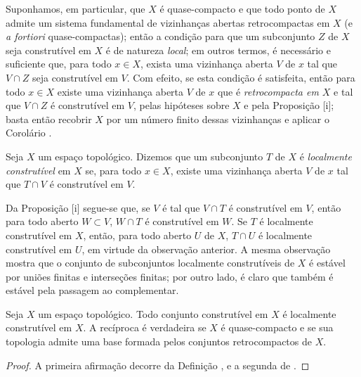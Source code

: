 \begin{env}[9.1.10]
\label{0.9.1.10}
Suponhamos, em particular, que $X$ é quase-compacto e que todo ponto
de $X$ admite um sistema fundamental de vizinhanças abertas retrocompactas em $X$ (e \emph{a fortiori} quase-compactas); então a condição para que um subconjunto $Z$ de $X$ seja construtível em $X$ é de natureza \emph{local}; em outros termos, é necessário e suficiente que, para todo $x\in X$, exista uma vizinhança aberta $V$ de $x$ tal que $V\cap Z$ seja construtível em $V$.
Com efeito, se esta condição é satisfeita, então para todo $x\in X$ existe uma vizinhança aberta $V$ de $x$ que é \emph{retrocompacta em $X$} e tal que $V\cap Z$ é construtível em $V$, pelas hipóteses sobre $X$ e pela Proposição [i]; basta então recobrir $X$ por um número finito dessas vizinhanças e aplicar o Corolário .
\end{env}

\begin{definition}[9.1.11]
\label{0.9.1.11}
Seja $X$ um espaço topológico.
Dizemos que um subconjunto $T$ de $X$ é \emph{localmente construtível} em $X$ se, para todo $x\in X$, existe uma vizinhança aberta $V$ de $x$ tal que $T\cap V$ é construtível em $V$.
\end{definition}

Da Proposição [i] segue-se que, se $V$ é tal que $V\cap T$ é construtível em $V$, então para todo aberto $W\subset V$, $W\cap T$ é construtível em $W$.
Se $T$ é localmente construtível em $X$, então, para todo aberto $U$ de $X$, $T\cap U$ é localmente construtível em $U$, em virtude da observação anterior.
A mesma observação mostra que o conjunto de subconjuntos localmente construtíveis de $X$ é estável por uniões finitas e interseções finitas; por outro lado, é claro que também é estável pela passagem ao complementar.

\begin{proposition}[9.1.12]
\label{0.9.1.12}
Seja $X$ um espaço topológico.
Todo conjunto construtível em $X$ é localmente construtível em $X$.
A recíproca é verdadeira se $X$ é quase-compacto e se sua topologia admite uma base formada pelos conjuntos retrocompactos de $X$.
\end{proposition}

\begin{proof}
A primeira afirmação decorre da Definição , e a segunda de .
\end{proof}


